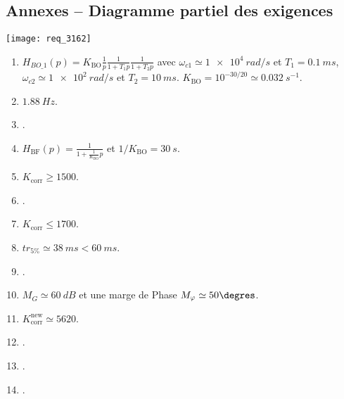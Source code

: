 \subsection*{Annexes -- Diagramme partiel des exigences\label{Annexe_diag_exigences}}
\begin{marginfigure}
\texttt{[image: req\_3162]}
\end{marginfigure}
\fi






\ifprof
\else
\ifcolle
\else
\begin{solution}
\footnotesize
\begin{enumerate}
\item $H_{BO\_1}(p) = K_{\text{BO}}  \frac{1}{p} \frac{1}{1+T_1p}  \frac{1}{1+T_2p} $ avec 
$\omega_{c1} \simeq \SI{1e4}{rad/s}$ et $T_1 = \SI{0,1}{ms}$, 
$\omega_{c2} \simeq \SI{1e2}{rad/s}$ et $T_2 = \SI{10}{ms}$. $K_{\text{BO}} = 10^{-30/20} \simeq  \SI{0,032}{s^{-1}}$.
\item $\SI{1,88}{Hz}$.
\item .
\item $H_{\text{BF}}(p)= \frac{1}{1+\frac{1}{K_{\text{BO}}}p}$ et $1/K_{\text{BO}} =\SI{30}{s}$.\\
\item $K_{\text{corr}} \ge  1500$.
\item .
\item $K_{\text{corr}} \leq  1700$.
\item $tr_{5\%} \simeq  \SI{38}{ms} < \SI{60}{ms}$.
\item .
\item $M_G \simeq \SI{60}{dB}$ et une marge de Phase $M_{\varphi} \simeq 50\degres$.
\item $K_{\text{corr}}^{\text{new}} \simeq 5620$.
\item .
\item .
\item .
\end{enumerate}
\end{solution}
\normalsize
\fi


\fi



